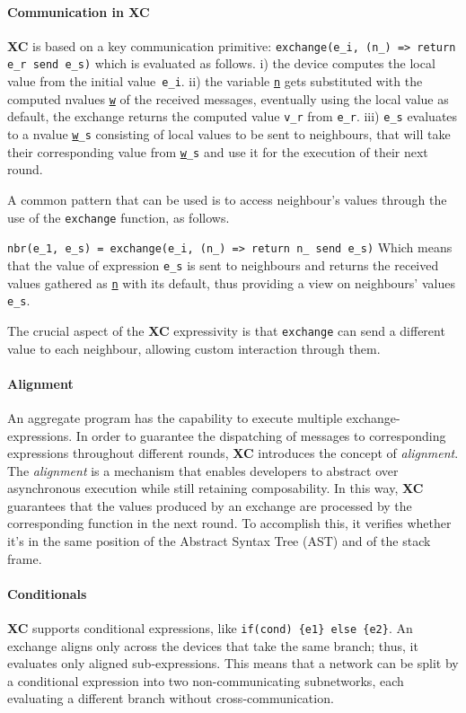 \paragraph{Communication in XC}
\textbf{XC} is based on a key communication primitive: \lstinline|exchange(e_i, (n_) => return e_r send e_s)| which is evaluated
as follows.
i) the device computes the local value from the initial value~\lstinline{e_i}.
ii) the variable \texttt{\underline{n}} gets substituted with the computed nvalues \texttt{\underline{w}} of the received messages, eventually
 using the local value as default, the exchange returns the computed value \lstinline{v_r} from \lstinline{e_r}.
iii) \lstinline{e_s} evaluates to a nvalue \texttt{\underline{w}\_s} consisting of local values to be sent to neighbours,
    that will take their corresponding value from \texttt{\underline{w}\_s} and use it for the execution of their next round.

A common pattern that can be used is to access neighbour's values through the use of the \texttt{exchange} function, as follows.

\lstinline|nbr(e_1, e_s) = exchange(e_i, (n_) => return n_ send e_s)|
Which means that the value of expression \lstinline{e_s} is sent to neighbours and returns the received values gathered as
\texttt{\underline{n}} with its default, thus providing a view on neighbours' values \lstinline{e_s}.

The crucial aspect of the \textbf{XC} expressivity is that \texttt{exchange} can send a different value to each neighbour,
allowing custom interaction through them.

\paragraph{Alignment}
An aggregate program has the capability to execute multiple exchange-expressions.
In order to guarantee the dispatching of messages to corresponding expressions throughout different rounds,
    \textbf{XC} introduces the concept of \emph{alignment}.
The \emph{alignment} is a mechanism that enables developers to abstract over asynchronous execution while still retaining
composability.
In this way, \textbf{XC} guarantees that the values produced by an exchange are processed by the corresponding function
in the next round.
To accomplish this, it verifies whether it's in the same position of the Abstract Syntax Tree (AST) and of the stack frame.

\paragraph{Conditionals}
\textbf{XC} supports conditional expressions, like \lstinline|if(cond) {e1} else {e2}|.
An exchange aligns only across the devices that take the same branch; thus, it evaluates only aligned sub-expressions.
This means that a network can be split by a conditional expression into two non-communicating subnetworks, each
evaluating a different branch without cross-communication.

